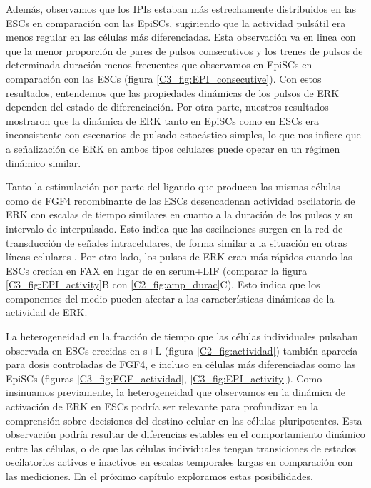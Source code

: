 \documentclass[./main.tex]{subfiles}
\begin{document}
Además, observamos que los IPIs estaban más estrechamente distribuidos en las ESCs en comparación con las EpiSCs, sugiriendo que la actividad pulsátil era menos regular en las células más diferenciadas. Esta observación va en linea con que la menor proporción de pares de pulsos consecutivos y los trenes de pulsos de determinada duración menos frecuentes que observamos en EpiSCs en comparación con las ESCs (figura \ref{C3_fig:EPI_consecutive}). Con estos resultados, entendemos que las propiedades dinámicas de los pulsos de ERK dependen del estado de diferenciación. Por otra parte, nuestros resultados mostraron que la dinámica de ERK tanto en EpiSCs como en ESCs era inconsistente con escenarios de pulsado estocástico simples, lo que nos infiere que a señalización de ERK en ambos tipos celulares puede operar en un régimen dinámico similar. 

Tanto la estimulación por parte del ligando que producen las mismas células como de FGF4 recombinante de las ESCs desencadenan actividad oscilatoria de ERK con escalas de tiempo similares en cuanto a la duración de los pulsos y su intervalo de interpulsado. Esto indica que las oscilaciones surgen en la red de transducción de señales intracelulares, de forma similar a la situación en otras líneas celulares \cite{Sparta2015}. Por otro lado, los pulsos de ERK eran más rápidos cuando las ESCs crecían en FAX en lugar de en serum+LIF (comparar la figura \ref{C3_fig:EPI_activity}B con \ref{C2_fig:amp_durac}C). Esto indica que los componentes del medio pueden afectar a las características dinámicas de la actividad de ERK. 

La heterogeneidad en la fracción de tiempo que las células individuales pulsaban observada en ESCs crecidas en s+L (figura \ref{C2_fig:actividad}) también aparecía para dosis controladas de FGF4, e incluso en células más diferenciadas como las EpiSCs (figuras \ref{C3_fig:FGF_actividad}, \ref{C3_fig:EPI_activity}). Como insinuamos previamente, la heterogeneidad que observamos en la dinámica de activación de ERK en ESCs podría ser relevante para profundizar en la comprensión sobre decisiones del destino celular en las células pluripotentes. Esta observación podría resultar de diferencias estables en el comportamiento dinámico entre las células, o de que las células individuales tengan transiciones de estados oscilatorios activos e inactivos en escalas temporales largas en comparación con las mediciones. En el próximo capítulo exploramos estas posibilidades. 
\end{document}
